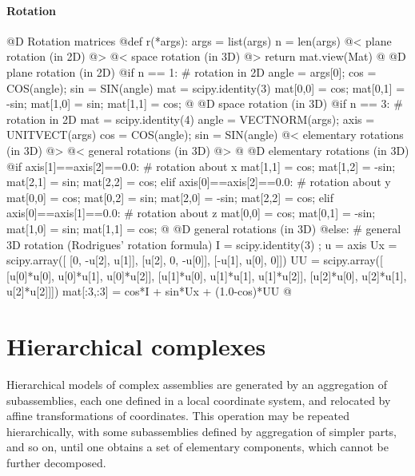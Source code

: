 \documentclass[11pt,oneside]{article}	%
\begin{document}
\paragraph{Rotation}
@D Rotation matrices
@{def r(*args): 
	args = list(args)
	n = len(args)
	@< plane rotation (in 2D) @>
	@< space rotation (in 3D) @>
	return mat.view(Mat)
@}
@D plane rotation (in 2D)
@{if n == 1: # rotation in 2D
	angle = args[0]; cos = COS(angle); sin = SIN(angle)
	mat = scipy.identity(3)
	mat[0,0] = cos;	mat[0,1] = -sin;
	mat[1,0] = sin;	mat[1,1] = cos;
@}
@D space rotation (in 3D)
@{if n == 3: # rotation in 2D
	mat = scipy.identity(4)
	angle = VECTNORM(args); axis = UNITVECT(args)
	cos = COS(angle); sin = SIN(angle)
	@< elementary rotations (in 3D) @>
	@< general rotations (in 3D) @>
@}
@D elementary rotations (in 3D)
@{if axis[1]==axis[2]==0.0:	# rotation about x
	mat[1,1] = cos;	mat[1,2] = -sin;
	mat[2,1] = sin;	mat[2,2] = cos;
elif axis[0]==axis[2]==0.0:	# rotation about y
	mat[0,0] = cos;	mat[0,2] = sin;
	mat[2,0] = -sin;	mat[2,2] = cos;
elif axis[0]==axis[1]==0.0:	# rotation about z
	mat[0,0] = cos;	mat[0,1] = -sin;
	mat[1,0] = sin;	mat[1,1] = cos;
@}
@D general rotations (in 3D)
@{else:		# general 3D rotation (Rodrigues' rotation formula)	
	I = scipy.identity(3) ; u = axis
	Ux = scipy.array([
		[0,		-u[2], 	 u[1]],
		[u[2],		0, 	-u[0]],
		[-u[1],	 u[0], 		0]])
	UU = scipy.array([
		[u[0]*u[0],	u[0]*u[1],	u[0]*u[2]],
		[u[1]*u[0],	u[1]*u[1],	u[1]*u[2]],
		[u[2]*u[0],	u[2]*u[1],	u[2]*u[2]]])
	mat[:3,:3] = cos*I + sin*Ux + (1.0-cos)*UU
@}


\section{Hierarchical complexes}
Hierarchical models of complex assemblies are generated by an aggregation
of subassemblies, each one defined in a local coordinate system, and
relocated by affine transformations of coordinates.  This operation
may be repeated hierarchically, with some subassemblies defined by
aggregation of simpler parts, and so on, until one obtains a set of
elementary components, which cannot be further decomposed.
\end{document}
